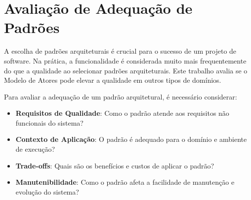 \section{Avaliação de Adequação de Padrões}

A escolha de padrões arquiteturais é crucial para o sucesso de um projeto de software. Na prática, a funcionalidade é considerada muito mais frequentemente do que a qualidade ao selecionar padrões arquiteturais. Este trabalho avalia se o Modelo de Atores pode elevar a qualidade em outros tipos de domínios.

Para avaliar a adequação de um padrão arquitetural, é necessário considerar:

\begin{itemize}
    \item \textbf{Requisitos de Qualidade}: Como o padrão atende aos requisitos não funcionais do sistema?
    
    \item \textbf{Contexto de Aplicação}: O padrão é adequado para o domínio e ambiente de execução?
    
    \item \textbf{Trade-offs}: Quais são os benefícios e custos de aplicar o padrão?
    
    \item \textbf{Manutenibilidade}: Como o padrão afeta a facilidade de manutenção e evolução do sistema?
\end{itemize}
